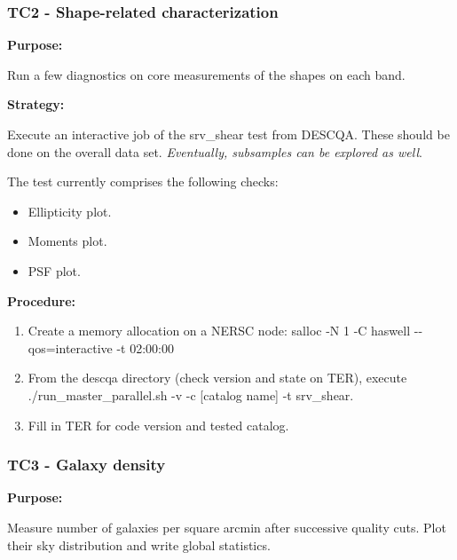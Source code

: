 \documentclass[12pt, a4paper]{article}
\begin{document}
\subsubsection{TC2 - Shape-related characterization}
\textbf{Purpose:} 

Run a few diagnostics on core measurements of the shapes on each band. 

\textbf{Strategy:} 

Execute an interactive job of the srv\_shear test from DESCQA. These should be done on the overall data set.  \textit{Eventually, subsamples can be explored as well}.

The test currently comprises the following checks:
\begin{itemize}
	\item Ellipticity plot. 
	\item Moments plot.
	\item PSF plot.
\end{itemize}

\textbf{Procedure:} 

\begin{enumerate}
	\item Create a memory allocation on a NERSC node: salloc -N 1 -C haswell -{}-qos=interactive -t 02:00:00
	\item From the descqa directory (check version and state on TER), execute ./run\_master\_parallel.sh -v -c [catalog name] -t srv\_shear. 
	\item Fill in TER for code version and tested catalog.
\end{enumerate}

\subsubsection{TC3 - Galaxy density}
\textbf{Purpose:} 

Measure number of galaxies per square arcmin after successive quality cuts. Plot their sky distribution and write global statistics.
\end{document}
